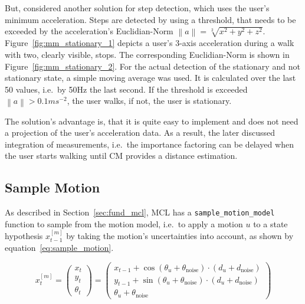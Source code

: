 But, \citet{shanklin:embedded_sensors} considered another solution for step detection, which uses the user's minimum acceleration. Steps are detected by using a threshold, that needs to be exceeded by the acceleration's Euclidian-Norm $\left\lVert a \right\rVert = \sqrt[2]{x^{2}+y^{2}+z^{2}}$. Figure~\ref{fig:mm_stationary_1} depicts a user's 3-axis acceleration during a walk with two, clearly visible, stops. The corresponding Euclidian-Norm is shown in Figure~\ref{fig:mm_stationary_2}. For the actual detection of the stationary and not stationary state, a simple moving average was used. It is calculated over the last 50 values, i.e.\ by 50Hz the last second. If the threshold is exceeded $\left\lVert a \right\rVert > 0.1 ms^{-2}$, the user walks, if not, the user is stationary.

The solution's advantage is, that it is quite easy to implement and does not need a projection of the user's acceleration data. As a result, the later discussed integration of measurements, i.e.\ the importance factoring can be delayed when the user starts walking until \acs{CM} provides a distance estimation.
 


\subsection{Sample Motion}\label{sec:algo_sample_motion}
As described in Section~\ref{sec:fund_mcl}, \acs{MCL} has a \texttt{sample\_motion\_model} function to sample from the motion model, i.e.\ to apply a motion $u$ to a state hypothesis $x^{[m]}_{t-1}$ by taking the motion's uncertainties into account, as shown by equation~\ref{eq:sample_motion}.

\begin{equation}\label{eq:sample_motion}
	x^{[m]}_t = \left(
    \begin{array}{c}
      x_t\\
      y_t\\
      \theta_t
    \end{array}
  \right) = \left(\begin{array}{c} x_{t-1} + \cos(\theta_u + \theta_{\text{noise}})\cdot (d_u + d_\text{noise}) \\ y_{t-1} + \sin(\theta_u + \theta_{\text{noise}})\cdot (d_u + d_\text{noise}) \\ \theta_u + \theta_{\text{noise}}
    \end{array}
  \right)
\end{equation}

